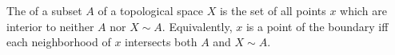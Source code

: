 The  of a subset $A$ of a topological space $X$ is the set of all points $x$ which are interior to neither $A$ nor $X \sim A$. Equivalently, $x$ is a point of the boundary iff each neighborhood of $x$ intersects both $A$ and $X \sim A$.
